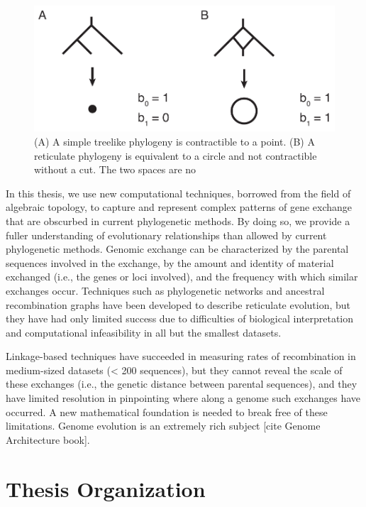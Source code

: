 \begin{figure}
\centering
\includegraphics[width=.8\columnwidth]{./fig/introduction/simple_tree_example.pdf}
\caption[Treelike and reticulate phylogenies]{(A) A simple treelike phylogeny is contractible to a point. (B) A reticulate phylogeny is equivalent to a circle and not contractible without a cut. The two spaces are no}
\label{intro:fig:simple_tree_example}
\end{figure}

In this thesis, we use new computational techniques, borrowed from the field of algebraic topology, to capture and represent complex patterns of gene exchange that are obscurbed in current phylogenetic methods.
By doing so, we provide a fuller understanding of evolutionary relationships than allowed by current phylogenetic methods.
Genomic exchange can be characterized by the parental sequences involved in the exchange, by the amount and identity of material exchanged (i.e., the genes or loci involved), and the frequency with which similar exchanges occur.
Techniques such as phylogenetic networks and ancestral recombination graphs have been developed to describe reticulate evolution, but they have had only limited success due to difficulties of biological interpretation and computational infeasibility in all but the smallest datasets.

Linkage-based techniques have succeeded in measuring rates of recombination in medium-sized datasets (< 200 sequences), but they cannot reveal the scale of these exchanges (i.e., the genetic distance between parental sequences), and they have limited resolution in pinpointing where along a genome such exchanges have occurred.
A new mathematical foundation is needed to break free of these limitations.
Genome evolution is an extremely rich subject [cite Genome Architecture book].

\section{Thesis Organization}

